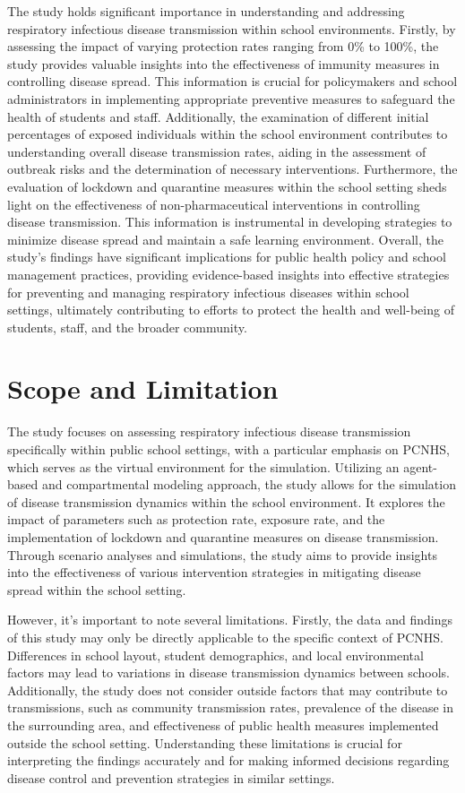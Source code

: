 The study holds significant importance in understanding and addressing respiratory infectious disease transmission within school environments. 
Firstly, by assessing the impact of varying protection rates ranging from 0\% to 100\%, the study provides valuable insights into the effectiveness of immunity measures in controlling disease spread. This information is crucial for policymakers and school administrators in implementing appropriate preventive measures to safeguard the health of students and staff. 
Additionally, the examination of different initial percentages of exposed individuals within the school environment contributes to understanding overall disease transmission rates, aiding in the assessment of outbreak risks and the determination of necessary interventions. Furthermore, the evaluation of lockdown and quarantine measures within the school setting sheds light on the effectiveness of non-pharmaceutical interventions in controlling disease transmission. This information is instrumental in developing strategies to minimize disease spread and maintain a safe learning environment. 
Overall, the study's findings have significant implications for public health policy and school management practices, providing evidence-based insights into effective strategies for preventing and managing respiratory infectious diseases within school settings, ultimately contributing to efforts to protect the health and well-being of students, staff, and the broader community.

\section{Scope and Limitation}

The study focuses on assessing respiratory infectious disease transmission specifically within public school settings, with a particular emphasis on PCNHS, which serves as the virtual environment for the simulation. Utilizing an agent-based and compartmental modeling approach, the study allows for the simulation of disease transmission dynamics within the school environment. It explores the impact of parameters such as protection rate, exposure rate, and the implementation of lockdown and quarantine measures on disease transmission. Through scenario analyses and simulations, the study aims to provide insights into the effectiveness of various intervention strategies in mitigating disease spread within the school setting.

However, it's important to note several limitations. Firstly, the data and findings of this study may only be directly applicable to the specific context of PCNHS. Differences in school layout, student demographics, and local environmental factors may lead to variations in disease transmission dynamics between schools. Additionally, the study does not consider outside factors that may contribute to transmissions, such as community transmission rates, prevalence of the disease in the surrounding area, and effectiveness of public health measures implemented outside the school setting. Understanding these limitations is crucial for interpreting the findings accurately and for making informed decisions regarding disease control and prevention strategies in similar settings.



